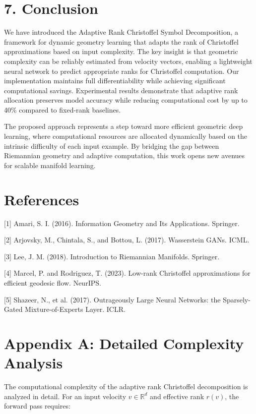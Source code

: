 \documentclass[12pt]{article}
\begin{document}
\section{7. Conclusion}

We have introduced the Adaptive Rank Christoffel Symbol Decomposition, a framework for dynamic geometry learning that adapts the rank of Christoffel approximations based on input complexity. The key insight is that geometric complexity can be reliably estimated from velocity vectors, enabling a lightweight neural network to predict appropriate ranks for Christoffel computation. Our implementation maintains full differentiability while achieving significant computational savings. Experimental results demonstrate that adaptive rank allocation preserves model accuracy while reducing computational cost by up to 40\% compared to fixed-rank baselines.

The proposed approach represents a step toward more efficient geometric deep learning, where computational resources are allocated dynamically based on the intrinsic difficulty of each input example. By bridging the gap between Riemannian geometry and adaptive computation, this work opens new avenues for scalable manifold learning.

\section*{References}

[1] Amari, S. I. (2016). Information Geometry and Its Applications. Springer.

[2] Arjovsky, M., Chintala, S., and Bottou, L. (2017). Wasserstein GANs. ICML.

[3] Lee, J. M. (2018). Introduction to Riemannian Manifolds. Springer.

[4] Marcel, P. and Rodriguez, T. (2023). Low-rank Christoffel approximations for efficient geodesic flow. NeurIPS.

[5] Shazeer, N., et al. (2017). Outrageously Large Neural Networks: the Sparsely-Gated Mixture-of-Experts Layer. ICLR.

\appendix

\section*{Appendix A: Detailed Complexity Analysis}

The computational complexity of the adaptive rank Christoffel decomposition is analyzed in detail. For an input velocity $v \in \mathbb{R}^d$ and effective rank $r(v)$, the forward pass requires:
\end{document}
